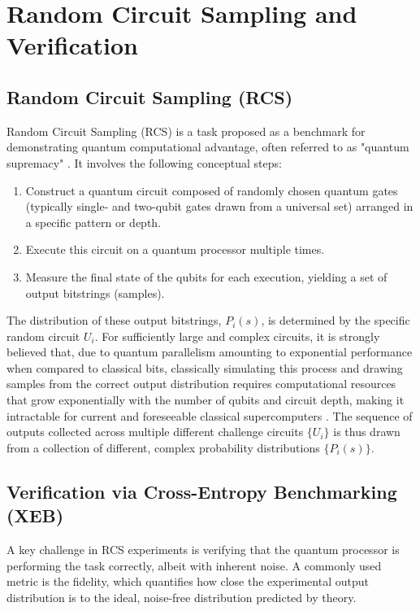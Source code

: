 \documentclass[11pt, a4paper]{article}
\begin{document}
\section{Random Circuit Sampling and Verification}

\subsection{Random Circuit Sampling (RCS)}
Random Circuit Sampling (RCS) is a task proposed as a benchmark for demonstrating quantum computational advantage, often referred to as "quantum supremacy" \cite{GoogleRCSBlog}. It involves the following conceptual steps:
\begin{enumerate}
    \item Construct a quantum circuit composed of randomly chosen quantum gates (typically single- and two-qubit gates drawn from a universal set) arranged in a specific pattern or depth.
    \item Execute this circuit on a quantum processor multiple times.
    \item Measure the final state of the qubits for each execution, yielding a set of output bitstrings (samples).
\end{enumerate}
The distribution of these output bitstrings, $P_i(s)$, is determined by the specific random circuit $U_i$. For sufficiently large and complex circuits, it is strongly believed that, due to quantum parallelism amounting to exponential performance when compared to classical bits, classically simulating this process and drawing samples from the correct output distribution requires computational resources that grow exponentially with the number of qubits and circuit depth, making it intractable for current and foreseeable classical supercomputers \cite{GoogleRCSBlog}. The sequence of outputs collected across multiple different challenge circuits $\{U_i\}$ is thus drawn from a collection of different, complex probability distributions $\{P_i(s)\}$.

\subsection{Verification via Cross-Entropy Benchmarking (XEB)}
A key challenge in RCS experiments is verifying that the quantum processor is performing the task correctly, albeit with inherent noise. A commonly used metric is the fidelity, which quantifies how close the experimental output distribution is to the ideal, noise-free distribution predicted by theory.
\end{document}
